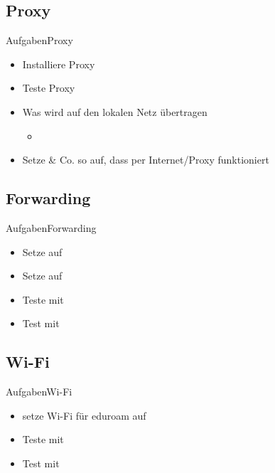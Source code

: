\documentclass{beamer}
\begin{document}
\subsection{Proxy}

\begin{frame}{Aufgaben}{Proxy}
 \begin{itemize}
  \item Installiere Proxy
  \item Teste Proxy 
  \item Was wird auf den lokalen Netz übertragen 
  \begin{itemize}
   \item {}
  \end{itemize}
  \item Setze  \& Co. so auf, dass \target per Internet/Proxy funktioniert 
 \end{itemize}
\end{frame}

\subsection{Forwarding}

\begin{frame}{Aufgaben}{Forwarding}
 \begin{itemize}
  \item Setze \host auf
  \item Setze \target auf
  \item Teste mit 
  \item Test mit 
 \end{itemize}
\end{frame}

\subsection{Wi-Fi}
\begin{frame}{Aufgaben}{Wi-Fi}
 \begin{itemize}
  \item setze Wi-Fi für eduroam auf
  \item Teste mit 
  \item Test mit 
 \end{itemize}
\end{frame}
\end{document}
